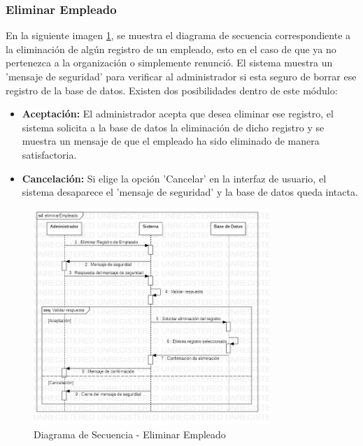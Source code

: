 \subsubsection{Eliminar Empleado}
En la siguiente imagen \ref{fig:Diagrama de Secuencia - Eliminar Empleado}, se muestra el diagrama de secuencia correspondiente a la eliminación de algún registro de un empleado, esto en el caso de que ya no pertenezca a la organización o simplemente renunció. El sistema muestra un 'mensaje de seguridad' para verificar al administrador si esta seguro de borrar ese registro de la base de datos. Existen dos posibilidades dentro de este módulo:
\begin{itemize}
	\item \textbf{Aceptación:} El administrador acepta que desea eliminar ese registro, el sistema solicita a la base de datos la eliminación de dicho registro y se muestra un mensaje de que el empleado ha sido eliminado de manera satisfactoria.
	\item \textbf{Cancelación:} Si elige la opción 'Cancelar' en la interfaz de usuario, el sistema desaparece el 'mensaje de seguridad' y la base de datos queda intacta. 
\end{itemize}
\begin{figure}[!h]
	\centering
	\includegraphics[width=0.8\textwidth]{./diseno/vprocesos/imagenes/eliminarEmpleado}
	\caption{Diagrama de Secuencia - Eliminar Empleado}
	\label{fig:Diagrama de Secuencia - Eliminar Empleado}
\end{figure}
\clearpage